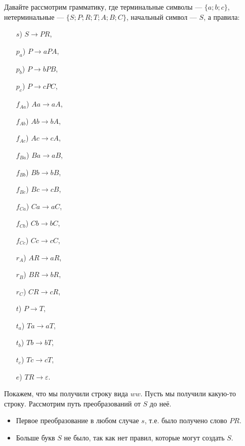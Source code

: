 \documentclass[12pt,a4paper]{article}
\begin{document}
    \begin{problem}{5}
        Давайте рассмотрим грамматику, где терминальные символы --- $\{a; b; c\}$, нетерминальные --- $\{S; P; R; T; A; B; C\}$, начальный символ --- $S$, а правила:
        \begin{multicols}{5}
            \begin{itemize}
                \item[$s$)] $S \to PR$,
                \item[$p_a$)] $P \to aPA$,
                \item[$p_b$)] $P \to bPB$,
                \item[$p_c$)] $P \to cPC$,
                \item[$f_{Aa}$)] $Aa \to aA$,
                \item[$f_{Ab}$)] $Ab \to bA$,
                \item[$f_{Ac}$)] $Ac \to cA$,
                \item[$f_{Ba}$)] $Ba \to aB$,
                \item[$f_{Bb}$)] $Bb \to bB$,
                \item[$f_{Bc}$)] $Bc \to cB$,
                \item[$f_{Ca}$)] $Ca \to aC$,
                \item[$f_{Cb}$)] $Cb \to bC$,
                \item[$f_{Cc}$)] $Cc \to cC$,
                \item[$r_A$)] $AR \to aR$,
                \item[$r_B$)] $BR \to bR$,
                \item[$r_C$)] $CR \to cR$, 
                \item[$t$)] $P \to T$,
                \item[$t_a$)] $Ta \to aT$,
                \item[$t_b$)] $Tb \to bT$,
                \item[$t_c$)] $Tc \to cT$,
                \item[$e$)] $TR \to \varepsilon$.  
            \end{itemize}
        \end{multicols}
        Покажем, что мы получили строку вида $ww$. Пусть мы получили какую-то строку. Рассмотрим путь преобразований от $S$ до неё.
        \begin{itemize}
            \item Первое преобразование в любом случае $s$, т.е. было получено слово $PR$.
            \item Больше букв $S$ не было, так как нет правил, которые могут создать $S$.

\end{itemize}
\end{problem}
\end{document}

